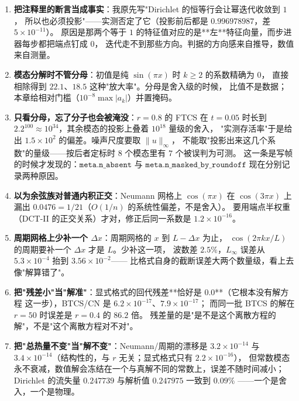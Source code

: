 \begin{enumerate}
        ADI 在 $r=100$ 时低估 $1.0\times10^{-4}$（$\lambda_2/\lambda_1=1-1.6\times10^{-4}$，
        $4000$ 步分不开）。容差要按谱间隙给。
  \item \textbf{把注释里的断言当成事实}：我原先写"Dirichlet 的恒等行会让幂迭代收敛到 $1$，
        所以也必须投影"——实测否定了它（投影前后都是 $0.996978987$，差 $5\times10^{-11}$）。
        原因是那两个等于 $1$ 的特征值对应的是**左**特征向量，而步进器每步都把端点钉成 $0$，
        迭代走不到那些方向。判据的方向感来自推导，数值来自测量。
  \item \textbf{模态分解时不管分母}：初值是纯 $\sin(\pi x)$ 时 $k\ge2$ 的系数精确为 $0$，
        直接相除得到 $22.1$、$18.5$ 这种"放大率"。分母是舍入级的时候，
        比值不是数据；本章给相对门槛（$10^{-8}\max|a_k|$）并置掩码。
  \item \textbf{只看分母，忘了分子也会被淹没}：$r=0.8$ 的 FTCS 在 $t=0.05$ 时长到
        $2.2^{100}\approx10^{34}$，其余模态的投影上叠着 $10^{18}$ 量级的舍入，
        "实测存活率"于是给出 $1.5\times10^{2}$ 的偏差。噪声尺度要取 $\|u\|_\infty$，
        不能取"投影出来这几个系数"的量级——按后者定标时 $8$ 个模态里有 $7$ 个被误判为可测。
        这一条是写帧的时候才发现的：$\texttt{meta.n\_absent}$ 与
        $\texttt{meta.n\_masked\_by\_roundoff}$ 现在分别记录两种原因。
  \item \textbf{以为余弦族对普通内积正交}：Neumann 网格上 $\cos(\pi x)$ 在
        $\cos(3\pi x)$ 上漏出 $0.0476=1/21$（$O(1/n)$ 的系统性偏差，不是舍入）。
        要用端点半权重（DCT-II 的正交关系）才对，修正后同一系数是 $1.2\times10^{-16}$。
  \item \textbf{周期网格上少补一个 $\Delta x$}：周期网格的 $x$ 到 $L-\Delta x$ 为止，
        $\cos(2\pi kx/L)$ 的周期要补一个 $\Delta x$ 才是 $L$。少补这一项，
        波数差 $2.5\%$，$L_\infty$ 误差从 $5.3\times10^{-4}$ 抬到 $3.56\times10^{-2}$——
        比格式自身的截断误差大两个数量级，看上去像"解算错了"。
  \item \textbf{把"残差小"当"解准"}：显式格式的回代残差**恰好是 $0.0$**（它根本没有解方程
        这一步），BTCS/CN 是 $6.2\times10^{-17}$、$7.9\times10^{-17}$；
        而同一批 BTCS 的解在 $r=50$ 时误差是 $r=0.4$ 的 $86.2$ 倍。
        残差量的是"是不是这个离散方程的解"，不是"这个离散方程对不对"。
  \item \textbf{把"总热量不变"当"解不变"}：Neumann/周期的漂移是 $3.2\times10^{-14}$ 与
        $3.4\times10^{-14}$（结构性的，与 $r$ 无关；显式格式只有 $2.2\times10^{-16}$），
        但常数模态永不衰减，数值解会冻结在一个与真解不同的常数上，误差不随时间减小；
        Dirichlet 的流失量 $0.247739$ 与解析值 $0.247975$ 一致到 $0.09\%$
        ——一个是舍入，一个是物理。
\end{enumerate}
